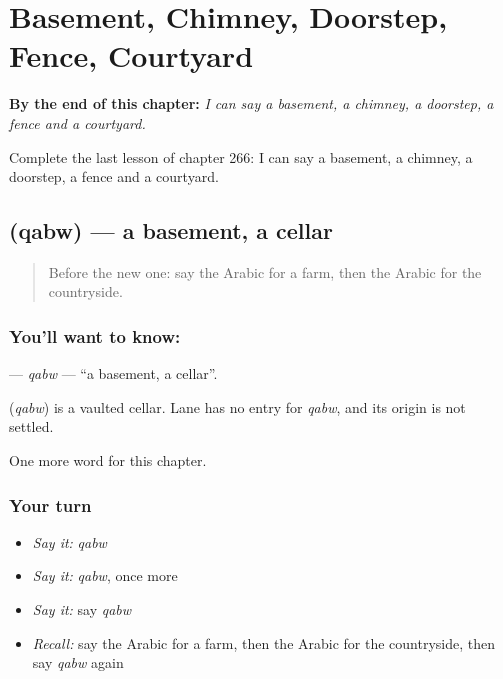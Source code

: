 
\chapter{Basement, Chimney, Doorstep, Fence, Courtyard}
\label{ch:ar-basement-chimney-doorstep-fence-courtyard}

\begin{chapteropening}
\textbf{By the end of this chapter:} \emph{I can say a basement, a chimney, a doorstep, a fence and a courtyard.}

Complete the last lesson of chapter 266: I can say a basement, a chimney, a doorstep, a fence and a courtyard.
\end{chapteropening}

\section[\texorpdfstring{\ar{قبو} (qabw)}{قبو (qabw)}]{ (qabw) — a basement, a cellar}

\label{lesson:AR-C266-qabw}



\begin{quote}
Before the new one: say the Arabic for a farm, then the Arabic for the countryside.
\end{quote}

\subsection*{You'll want to know: }
\textbf{} — \emph{qabw} — \textquotedblleft{}a basement, a cellar\textquotedblright{}.

\begin{cousinweb}
\textbf{} (\emph{qabw}) is a vaulted cellar. Lane has no entry for \emph{qabw}, and its origin is not settled.
\end{cousinweb}

\begin{grammarlens}[title={What you've built}]
One more word for this chapter.
\end{grammarlens}

\subsection*{Your turn}
\begin{itemize}
\raggedright
  \item \emph{Say it:} \emph{qabw}
  \item \emph{Say it:} \emph{qabw}, once more
  \item \emph{Say it:} say \emph{qabw}
  \item \emph{Recall:} say the Arabic for a farm, then the Arabic for the countryside, then say \emph{qabw} again
\end{itemize}

